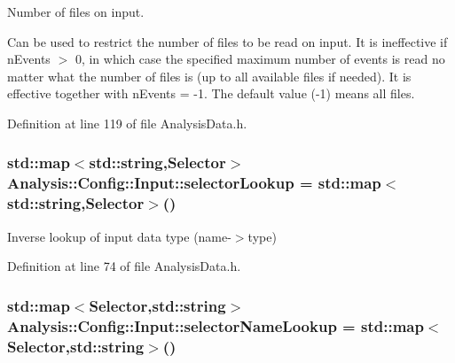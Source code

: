 Number of files on input. 

Can be used to restrict the number of files to be read on input. It is ineffective if {\ttfamily n\+Events} $>$ 0, in which case the specified maximum number of events is read no matter what the number of files is (up to all available files if needed). It is effective together with {\ttfamily n\+Events} = -\/1. The default value (-\/1) means all files. 

Definition at line 119 of file Analysis\+Data.\+h.

\subsubsection[{\texorpdfstring{selector\+Lookup}{selectorLookup}}]{\setlength{\rightskip}{0pt plus 5cm}std\+::map$<$std\+::string,{\bf Selector}$>$ Analysis\+::\+Config\+::\+Input\+::selector\+Lookup = std\+::map$<$std\+::string,{\bf Selector}$>$()\hspace{0.3cm}{\ttfamily [static]}}\hypertarget{namespaceAnalysis_1_1Config_1_1Input_ab48a0d60ba640c5a21e979d16e58115c}{}\label{namespaceAnalysis_1_1Config_1_1Input_ab48a0d60ba640c5a21e979d16e58115c}


Inverse lookup of input data type (name-\/$>$type) 



Definition at line 74 of file Analysis\+Data.\+h.

\subsubsection[{\texorpdfstring{selector\+Name\+Lookup}{selectorNameLookup}}]{\setlength{\rightskip}{0pt plus 5cm}std\+::map$<${\bf Selector},std\+::string$>$ Analysis\+::\+Config\+::\+Input\+::selector\+Name\+Lookup = std\+::map$<${\bf Selector},std\+::string$>$()\hspace{0.3cm}{\ttfamily [static]}}\hypertarget{namespaceAnalysis_1_1Config_1_1Input_a3464419de97f63c4c1740c3fde0deff0}{}\label{namespaceAnalysis_1_1Config_1_1Input_a3464419de97f63c4c1740c3fde0deff0}


